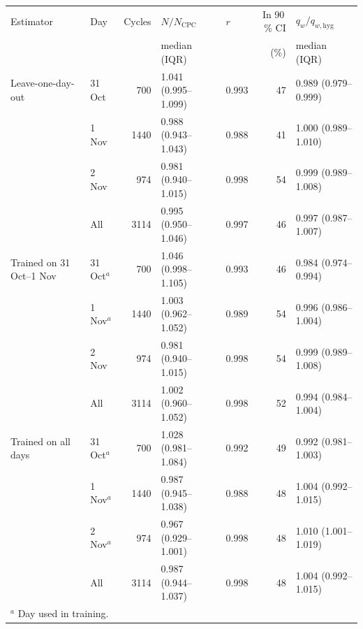 \begin{tabular}{llrllrl}
\toprule
Estimator & Day & Cycles & $N/N_\mathrm{CPC}$ & $r$ & In 90\,\% CI & $q_w/q_{w,\mathrm{hyg}}$ \\
 & & & median (IQR) & & (\%) & median (IQR) \\
\midrule
Leave-one-day-out & 31 Oct & 700 & 1.041 (0.995--1.099) & 0.993 & 47 & 0.989 (0.979--0.999) \\
 & 1 Nov & 1440 & 0.988 (0.943--1.043) & 0.988 & 41 & 1.000 (0.989--1.010) \\
 & 2 Nov & 974 & 0.981 (0.940--1.015) & 0.998 & 54 & 0.999 (0.989--1.008) \\
 & All & 3114 & 0.995 (0.950--1.046) & 0.997 & 46 & 0.997 (0.987--1.007) \\
\midrule
Trained on 31 Oct--1 Nov & 31 Oct$^{a}$ & 700 & 1.046 (0.998--1.105) & 0.993 & 46 & 0.984 (0.974--0.994) \\
 & 1 Nov$^{a}$ & 1440 & 1.003 (0.962--1.052) & 0.989 & 54 & 0.996 (0.986--1.004) \\
 & 2 Nov & 974 & 0.981 (0.940--1.015) & 0.998 & 54 & 0.999 (0.989--1.008) \\
 & All & 3114 & 1.002 (0.960--1.052) & 0.998 & 52 & 0.994 (0.984--1.004) \\
\midrule
Trained on all days & 31 Oct$^{a}$ & 700 & 1.028 (0.981--1.084) & 0.992 & 49 & 0.992 (0.981--1.003) \\
 & 1 Nov$^{a}$ & 1440 & 0.987 (0.945--1.038) & 0.988 & 48 & 1.004 (0.992--1.015) \\
 & 2 Nov$^{a}$ & 974 & 0.967 (0.929--1.001) & 0.998 & 48 & 1.010 (1.001--1.019) \\
 & All & 3114 & 0.987 (0.944--1.037) & 0.998 & 48 & 1.004 (0.992--1.015) \\
\bottomrule
\multicolumn{7}{l}{\footnotesize $^{a}$ Day used in training.}\\
\end{tabular}
